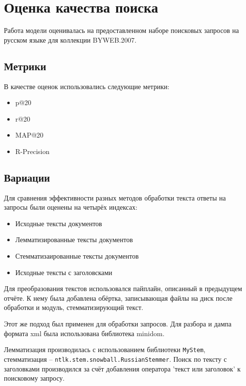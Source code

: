 \section{Оценка качества поиска}

Работа модели оценивалась на предоставленном наборе поисковых запросов на русском языке для коллекции BYWEB.2007.
\subsection{Метрики}

В качестве оценок использовались следующие метрики:


\begin{itemize}
 	\item p@20
 	\item r@20
 	\item MAP@20
 	\item R-Precision
\end{itemize}

\subsection{Вариации}

Для сравнения эффективности разных методов обработки текста ответы на запросы были оценены на четырёх индексах: 

\begin{itemize}
	\item Исходные тексты документов
	\item Лемматизированные тексты документов
	\item Стемматизаированные тексты документов
	\item Исходные тексты с заголовсками
\end{itemize}

Для преобразования текстов использовался пайплайн, описанный в предыдущем отчёте. К нему была добавлена обёртка, записывающая файлы на диск после обработки и модуль, стемматизирующий текст.

Этот же подход был применен для обработки запросов. Для разбора и дампа формата xml была использована библиотека minidom.

Лемматизация производилась с использованием библиотеки \texttt{MyStem}, стемматизация -- \texttt{ntlk.stem.snowball.RussianStemmer}. Поиск по тексту с заголовками производился за счёт добавления оператора 'текст или заголовок' к поисковому запросу.

